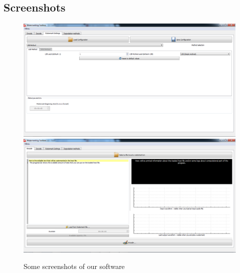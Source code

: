 \subsection{Screenshots}
\begin{figure}
\centering
\includegraphics[scale=0.5]{images/choix.png}
\includegraphics[scale=0.5]{images/encode.png}
\caption{Some screenshots of our software}
\end{figure}